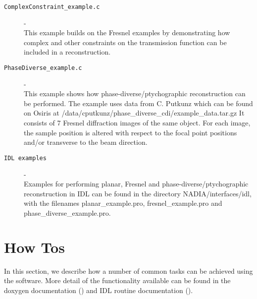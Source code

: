 \documentclass[]{nadia}
\begin{document}
\begin{description}
\item[{\tt ComplexConstraint\_example.c }]- \\ This example builds on
  the Fresnel examples by demonstrating how complex and other
  constraints on the transmission function can be included in a
  reconstruction.

\item[{\tt PhaseDiverse\_example.c }]- \\ This example shows how
  phase-diverse/ptychographic reconstruction can be performed. The
  example uses data from C. Putkunz which can be found on Osiris at
  /data/cputkunz/phase\_diverse\_cdi/example\_data.tar.gz It consists
  of 7 Fresnel diffraction images of the same object.  For each image,
  the sample position is altered with respect to the focal point
  positions and/or transverse to the beam direction.

\item[{\tt IDL examples}] - \\ Examples for performing planar, Fresnel
  and phase-diverse/ptychographic reconstruction in IDL can be found
  in the directory NADIA/interfaces/idl, with the filenames
  planar\_example.pro, fresnel\_example.pro and
  phase\_diverse\_example.pro.

\end{description}


\newpage

\section{How Tos}
\label{how to}

In this section, we describe how a number of common tasks can be
achieved using the software. More detail of the functionality
available can be found in the doxygen documentation () and IDL routine
documentation (). 
\end{document}
